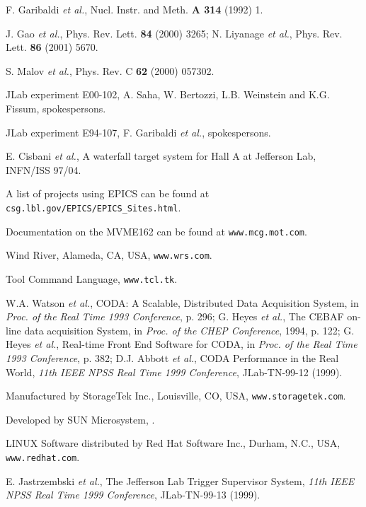 \begin{thebibliography}{99}
 F. Garibaldi {\em et al.}, 
\newblock Nucl. Instr. and Meth. {\bf A 314} (1992) 1. 

 J. Gao {\em et al.},
\newblock Phys. Rev. Lett. {\bf 84} (2000) 3265; 
N. Liyanage {\it et al.}, Phys. Rev. Lett. {\bf 86} (2001) 5670.

 S. Malov {\em et al.},
\newblock Phys. Rev. C {\bf 62} (2000) 057302.

 JLab experiment E00-102,
\newblock A. Saha, W. Bertozzi, L.B. Weinstein and K.G. Fissum, spokespersons.

 JLab experiment E94-107,
\newblock F. Garibaldi {\it et al.}, spokespersons.

 E. Cisbani {\it et al.}, A waterfall target system for 
Hall A at Jefferson Lab, INFN/ISS 97/04.

 A list of projects using EPICS can be found at
{\tt csg.lbl.gov/EPICS/EPICS\_Sites.html}.

 Documentation on the MVME162 can be found at
{\tt www.mcg.mot.com}.

Wind River,
\newblock Alameda, CA, USA, {\tt www.wrs.com}.

 Tool Command Language,
{\tt www.tcl.tk}.

 W.A. Watson {\em et al.},
\newblock  CODA: A Scalable,
Distributed Data Acquisition System, in {\em Proc. of the
Real Time 1993 Conference}, p. 296;  
G. Heyes {\em et al.}, The CEBAF on-line data
acquisition System, in {\it Proc. of the CHEP Conference}, 1994,
p. 122; 
G. Heyes {\em et al.}, Real-time
Front End Software for CODA, in {\em Proc. of the Real Time
1993 Conference}, p. 382;  
D.J. Abbott {\it et al.}, CODA Performance in the Real World,
{\it 11th IEEE NPSS Real Time 1999 Conference}, JLab-TN-99-12 (1999).

 Manufactured by StorageTek Inc.,
\newblock Louisville, CO, USA, {\tt www.storagetek.com}.

 Developed by SUN Microsystem,
.

 LINUX Software distributed by Red Hat Software Inc.,
\newblock Durham, N.C., USA, {\tt www.redhat.com}.

 E. Jastrzembski {\em et al.}, 
\newblock The Jefferson Lab Trigger Supervisor System, {\it 11th IEEE NPSS Real Time 1999
Conference}, JLab-TN-99-13 (1999).


\end{thebibliography}
